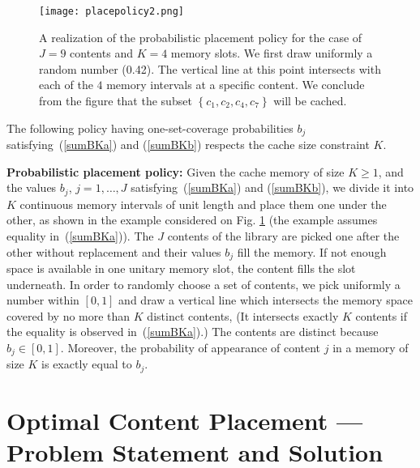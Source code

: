 \documentclass[conference,twocolum,final]{IEEEtran}
\begin{document}
\begin{figure}[t!]
\centering
\texttt{[image: placepolicy2.png]}
\caption{A realization of the probabilistic placement policy for the case of $J=9$ contents and $K=4$ memory slots. We first draw uniformly a random number (0.42). The vertical line at this point intersects with each of the $4$ memory intervals at a specific content. We conclude from the figure that the subset $\left\{c_1,c_2,c_4,c_7\right\}$ will be cached.}
\label{PlacePolicy}
\end{figure}

The following policy having one-set-coverage probabilities $b_j$ satisfying~(\ref{sumBKa}) and (\ref{sumBKb}) respects the cache size constraint $K$.

\textbf{Probabilistic placement policy:} Given the cache memory of size $K\geq 1$, and 
 the values $b_j$, $j=1,\ldots,J$ satisfying~(\ref{sumBKa}) and (\ref{sumBKb}), 
we divide it into $K$ continuous memory intervals of unit length and place them one under the other, as shown in the example considered on Fig. \ref{PlacePolicy} (the example assumes  equality in~(\ref{sumBKa})). The $J$ contents of the library are picked one after the other without replacement and their values $b_j$ fill the memory. If not enough space is available in one unitary memory slot, the content fills the slot underneath. 
In order to randomly choose a set of contents, 
we pick uniformly a number within $\left[0,1\right]$ and draw a vertical line which intersects the memory space covered by no more than $K$ distinct contents, (It intersects exactly $K$ contents if the equality is observed in~(\ref{sumBKa}).) The contents are distinct because $b_j\in\left[0,1\right]$. 
Moreover, the probability of appearance of content $j$ in a memory of size $K$ is exactly equal to $b_j$. 




\section{Optimal Content Placement --- Problem Statement and Solution}
\label{secIII}
\end{document}
